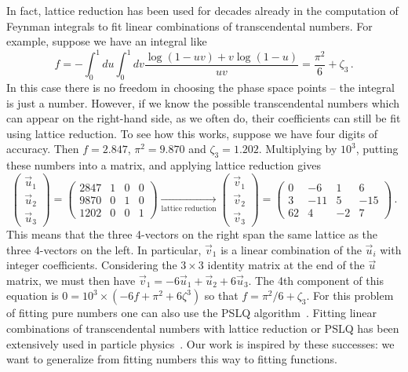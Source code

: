 \documentclass[a4paper,11pt]{article}
\begin{document}
In fact, lattice reduction has been used for decades already in the computation of Feynman integrals to fit linear combinations of transcendental numbers. 
For example, suppose we have an integral like
\begin{equation}
f=   - \int _0^1 du \int _0^1 dv \frac{\log (1-u v)+v \log (1-u)}{u v} = \frac{\pi^2}{6} +\zeta_3 \,.
\label{fnums}
\end{equation}
In this case there is no freedom in choosing the phase space points -- the integral is just a number. However, if we know the possible transcendental numbers which can appear on the right-hand side, as we often do, their coefficients can still be fit using lattice reduction. 
To see how this works, suppose we have four digits of accuracy. Then $f=2.847$, $\pi^2 = 9.870$ and $\zeta_3 = 1.202$. Multiplying by $10^3$, putting these numbers into a matrix, and applying lattice reduction gives
\begin{equation}
  \left(\begin{array}{c}
    \vec{u}_1\\
    \vec{u}_2\\
    \vec{u}_3
  \end{array}\right) = \left(\begin{array}{cccc}
    2847 & 1 & 0 & 0 \\
    9870 &0 & 1 & 0\\
    1202 &0 & 0 & 1
  \end{array}\right) \xrightarrow[\text{lattice reduction}]{}
  \left(\begin{array}{c}
    \vec{v}_1\\
    \vec{v}_2\\
    \vec{v}_3
  \end{array}\right) = \left(\begin{array}{cccc}
    0 & - 6 & 1 & 6\\
    3 & - 11 & 5 & - 15 \\
    62 & 4 & - 2 & 7 
  \end{array}\right) \,.
  \label{eq:llexample}
\end{equation}
This means that the three 4-vectors on the right span the same lattice as the three 4-vectors on the left. In particular, $\vec{v}_1$ is a linear combination of the $\vec{u}_i$ with integer coefficients. Considering the $3 \times 3$ identity matrix at the end of the $\vec{u}$ matrix, we must then have
$\vec{v}_1 = - 6 \vec{u}_1 + \vec{u}_2 + 6 \vec{u}_3$. The 4th component of this equation is $0 = 10^3 \times (- 6 f + \pi^2 + 6 \zeta^3)$ so that $f = \pi^2/6 + \zeta_3$. 
For this problem of fitting pure numbers one can also use the PSLQ algorithm~\cite{Ferguson:1992,PSLQref,Bailey:1999nv}. 
Fitting linear combinations of transcendental numbers with lattice reduction or PSLQ has been extensively used in particle physics~\cite{Chachamis:2008fx,Lee:2010cga,Kelley:2011ng,Laporta:2017okg,Chicherin:2017dob, Lee:2018ojn,Acres:2021sss, Agarwal:2021zft, Canko:2024ara}.
Our work is inspired by these successes: we want to generalize from fitting numbers this way to fitting functions.
\end{document}
